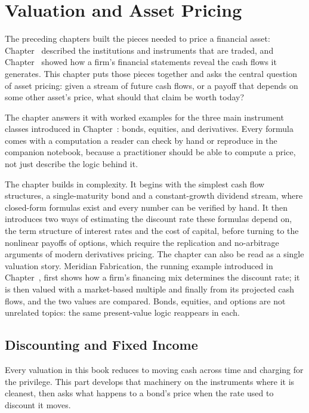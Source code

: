 \documentclass[../ai_in_finance]{subfiles}
\begin{document}
\chapter{Valuation and Asset Pricing}

The preceding chapters built the pieces needed to price a financial asset: Chapter~ described the institutions and instruments that are traded, and Chapter~ showed how a firm's financial statements reveal the cash flows it generates. This chapter puts those pieces together and asks the central question of asset pricing: given a stream of future cash flows, or a payoff that depends on some other asset's price, what should that claim be worth today?

The chapter answers it with worked examples for the three main instrument classes introduced in Chapter~: bonds, equities, and derivatives. Every formula comes with a computation a reader can check by hand or reproduce in the companion notebook, because a practitioner should be able to compute a price, not just describe the logic behind it.

The chapter builds in complexity. It begins with the simplest cash flow structures, a single-maturity bond and a constant-growth dividend stream, where closed-form formulas exist and every number can be verified by hand.
It then introduces two ways of estimating the discount rate these formulas depend on, the term structure of interest rates and the cost of capital, before turning to the nonlinear payoffs of options, which require the replication and no-arbitrage arguments of modern derivatives pricing. The chapter can also be read as a single valuation story. Meridian Fabrication, the running example introduced in Chapter~, first shows how a firm's financing mix determines the discount rate; it is then valued with a market-based multiple and finally from its projected cash flows, and the two values are compared. Bonds, equities, and options are not unrelated topics: the same present-value logic reappears in each.

\section{Discounting and Fixed Income}

Every valuation in this book reduces to moving cash across time and charging for the privilege. This part develops that machinery on the instruments where it is cleanest, then asks what happens to a bond's price when the rate used to discount it moves.
\end{document}
